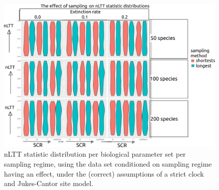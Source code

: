 \documentclass{article}
\begin{document}
\begin{figure}[!htbp]
  \includegraphics[width=\textwidth]{fig_sampling.png}
  \caption{
    nLTT statistic distribution per biological parameter set per sampling
    regime, using the data set conditioned on sampling regime having an effect, 
    under the (correct) assumptions of a strict clock and Jukes-Cantor site model.
  }
\end{figure}

\end{document}

